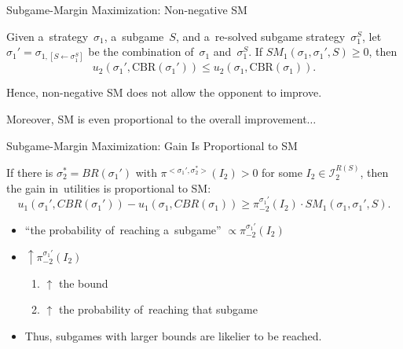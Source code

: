 \documentclass{beamer}
\theoremstyle{definition}
\newcommand{\I}{\mathcal{I}}
\begin{document}
  \begin{frame}{Subgame-Margin Maximization: Non-negative SM}
    \begin{framed}
      \begin{Theorem}
        Given a~strategy~$\sigma_1$, a~subgame~$S$, and a~re-solved subgame strategy~$\sigma_1^S$, let $\sigma_1' = \sigma_{1, [S \leftarrow \sigma_1^S]}$ be the combination of~$\sigma_1$ and~$\sigma_1^S$.
        If $SM_1 (\sigma_1, \sigma_1' , S) \geq 0$, then
        \[
          u_2(\sigma_1', \textrm{CBR}(\sigma_1')) \leq  u_2(\sigma_1, \textrm{CBR}(\sigma_1)).
        \]
      \end{Theorem}
    \end{framed}
    \pause

    Hence, non-negative SM does not allow the opponent to improve.
    \pause

    Moreover, SM is even proportional to the overall improvement$\ldots$
  \end{frame}

  \begin{frame}{Subgame-Margin Maximization: Gain Is Proportional to SM}
    \pause
    \begin{framed}
      \begin{theorem}
        If there is $\sigma_2^* = BR(\sigma_1')$ with $\pi^{<\sigma_1',\sigma_2^*>} (I_2) > 0$ for some $I_2 \in\I_2^{R(S)}$, then the gain in~utilities is proportional to SM:
        \[
          u_1(\sigma_1', CBR(\sigma_1')) - u_1(\sigma_1, CBR(\sigma_1)) \ge \pi_{-2}^{\sigma_1'} (I_2) \cdot SM_1(\sigma_1, \sigma_1', S).
        \]
      \end{theorem}
    \end{framed}
    \pause

    \begin{itemize}[<+- | alert@+>]
       \item ``the probability of~reaching a~subgame'' $\propto \pi_{-2}^{\sigma_1'}(I_2)$
       \item $\uparrow \pi_{-2}^{\sigma_1'}(I_2)$
         \begin{enumerate}[$\Rightarrow$]
           \item $\uparrow$ the bound
           \item $\uparrow$ the probability of~reaching that subgame
         \end{enumerate}
       \item Thus, subgames with larger bounds are likelier to be reached.
    \end{itemize}
  \end{frame}
\end{document}
